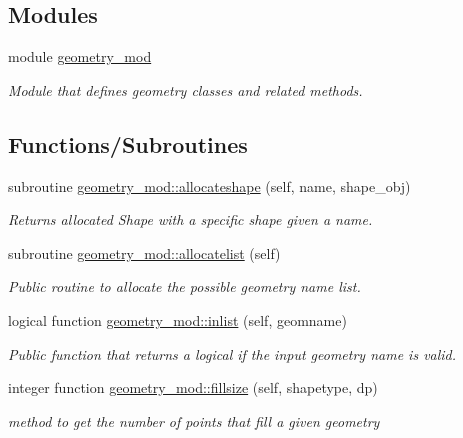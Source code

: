 \subsection*{Modules}
\begin{DoxyCompactItemize}
\item 
module \mbox{\hyperlink{namespacegeometry__mod}{geometry\+\_\+mod}}
\begin{DoxyCompactList}\small\item\em Module that defines geometry classes and related methods. \end{DoxyCompactList}\end{DoxyCompactItemize}
\subsection*{Functions/\+Subroutines}
\begin{DoxyCompactItemize}
\item 
subroutine \mbox{\hyperlink{namespacegeometry__mod_a571a294c2a1869259d21267005c32025}{geometry\+\_\+mod\+::allocateshape}} (self, name, shape\+\_\+obj)
\begin{DoxyCompactList}\small\item\em Returns allocated Shape with a specific shape given a name. \end{DoxyCompactList}\item 
subroutine \mbox{\hyperlink{namespacegeometry__mod_a1b6f259b0b6be71e02ffae7670f7d8ba}{geometry\+\_\+mod\+::allocatelist}} (self)
\begin{DoxyCompactList}\small\item\em Public routine to allocate the possible geometry name list. \end{DoxyCompactList}\item 
logical function \mbox{\hyperlink{namespacegeometry__mod_a22dd77024fce56da299445a697256155}{geometry\+\_\+mod\+::inlist}} (self, geomname)
\begin{DoxyCompactList}\small\item\em Public function that returns a logical if the input geometry name is valid. \end{DoxyCompactList}\item 
integer function \mbox{\hyperlink{namespacegeometry__mod_ad790edd694561b33dad20cfa3a14e8f2}{geometry\+\_\+mod\+::fillsize}} (self, shapetype, dp)
\begin{DoxyCompactList}\small\item\em method to get the number of points that fill a given geometry \end{DoxyCompactList}\item 

\end{DoxyCompactItemize}
